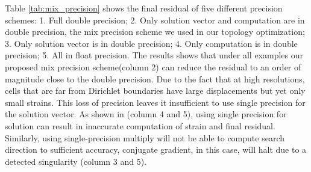 Table \ref{tab:mix_precision} shows the final residual of five different precision schemes: 1. Full double precision; 2. Only solution vector and computation are in double precision, the mix precision scheme we used in our topology optimization; 3. Only solution vector is in double precision; 4. Only computation is in double precision; 5. All in float precision. The results shows that under all examples our proposed mix precision scheme(column 2) can reduce the residual to an order of magnitude close to the double precision. Due to the fact that at high resolutions, cells that are far from Dirichlet boundaries have large displacements but yet only small strains. This loss of precision leaves it insufficient to use single precision for the solution vector. As shown in (column 4 and 5), using single precision for solution can result in inaccurate computation of strain and final residual. Similarly, using single-precision multiply will not be able to compute search direction to sufficient accuracy, conjugate gradient, in this case, will halt due to a detected singularity (column 3 and 5). 


